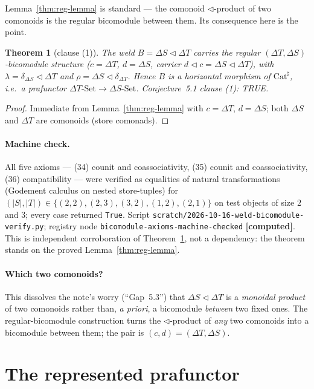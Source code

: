 \documentclass[11pt]{article}
\newtheorem{theorem}{Theorem}
\theoremstyle{definition}
\newcommand{\Set}{\mathrm{Set}}
\newcommand{\Cat}{\mathrm{Cat}^{\sharp}}
\newcommand{\comp}{\triangleleft}
\begin{document}
Lemma~\ref{thm:reg-lemma} is standard --- the comonoid $\comp$-product of two comonoids is
the regular bicomodule between them. Its consequence here is the point.

\begin{theorem}[clause (1)]\label{thm:regular}
The weld $B=\Delta S\comp\Delta T$ carries the regular $(\Delta T,\Delta S)$-bicomodule
structure ($c=\Delta T$, $d=\Delta S$, carrier $d\comp c=\Delta S\comp\Delta T$), with
$\lambda=\delta_{\Delta S}\comp\Delta T$ and $\rho=\Delta S\comp\delta_{\Delta T}$. Hence $B$ is
a horizontal morphism of $\Cat$, i.e.\ a prafunctor $\Delta T\text{-}\Set\to\Delta S\text{-}\Set$.
\emph{Conjecture~5.1 clause (1): TRUE.}
\end{theorem}

\begin{proof}
Immediate from Lemma~\ref{thm:reg-lemma} with $c=\Delta T$, $d=\Delta S$; both $\Delta S$
and $\Delta T$ are comonoids (store comonads).
\end{proof}

\paragraph{Machine check.}
All five axioms --- (34) counit and coassociativity, (35) counit and coassociativity,
(36) compatibility --- were verified as equalities of natural transformations (Godement
calculus on nested store-tuples) for
$(|S|,|T|)\in\{(2,2),(2,3),(3,2),(1,2),(2,1)\}$ on test objects of size $2$ and $3$; every
case returned \texttt{True}. Script
\texttt{scratch/2026-10-16-weld-bicomodule-verify.py}; registry node
\texttt{bicomodule-axioms-machine-checked} \textbf{[computed]}. This is independent
corroboration of Theorem~\ref{thm:regular}, not a dependency: the theorem stands on the
proved Lemma~\ref{thm:reg-lemma}.

\paragraph{Which two comonoids?}
This dissolves the note's worry (``Gap~5.3'') that $\Delta S\comp\Delta T$ is a
\emph{monoidal product} of two comonoids rather than, \emph{a priori}, a bicomodule
\emph{between} two fixed ones. The regular-bicomodule construction turns the $\comp$-product
of \emph{any} two comonoids into a bicomodule between them; the pair is
$(c,d)=(\Delta T,\Delta S)$.

\section{The represented prafunctor}\label{sec:represented}
\end{document}
